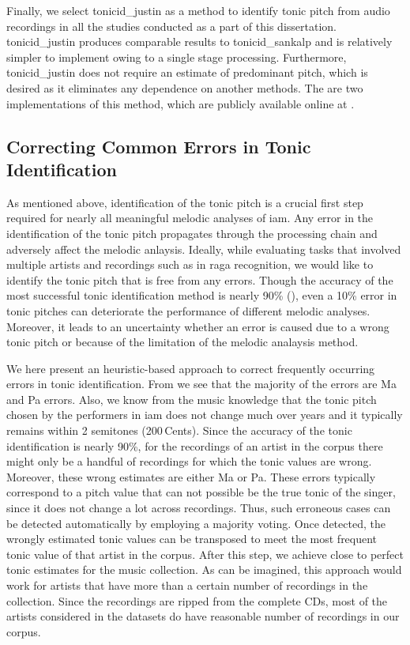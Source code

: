 {Finally, we select \acrshort{tonicid_justin} as a method to identify tonic pitch from audio recordings in all the studies conducted as a part of this dissertation. \acrshort{tonicid_justin} produces comparable results to \acrshort{tonicid_sankalp} and is relatively simpler to implement owing to a single stage processing. Furthermore, \acrshort{tonicid_justin} does not require an estimate of predominant pitch, which is desired as it eliminates any dependence on another methods. The are two implementations of this method, which are publicly available online at . 


\subsection{Correcting Common Errors in Tonic Identification}
\label{sec:pre_processing_tonic_identification_correcting_errors}

As mentioned above, identification of the tonic pitch is a crucial first step required for nearly all meaningful melodic analyses of \gls{iam}. Any error in the identification of the tonic pitch propagates through the processing chain and adversely affect the melodic anlaysis. Ideally, while evaluating tasks that involved multiple artists and recordings such as in \gls{raga} recognition, we would like to identify the tonic pitch that is free from any errors. Though the accuracy of the most successful tonic identification method is nearly 90\% (), even a 10\% error in tonic pitches can deteriorate the performance of different melodic analyses. Moreover, it leads to an uncertainty whether an error is caused due to a wrong tonic pitch or because of the limitation of the melodic analaysis method. 

We here present an heuristic-based approach to correct frequently occurring errors in tonic identification. From  we see that the majority of the errors are Ma and Pa errors. Also, we know from the music knowledge that the tonic pitch chosen by the performers in \gls{iam} does not change much over years and it typically remains within 2 semitones (200\,Cents). Since the accuracy of the tonic identification is nearly 90\%, for the recordings of an artist in the corpus there might only be a handful of recordings for which the tonic values are wrong. Moreover, these wrong estimates are either Ma or Pa. These errors typically correspond to a pitch value that can not possible be the true tonic of the singer, since it does not change a lot across recordings. Thus, such erroneous cases can be detected automatically by employing a majority voting. Once detected, the wrongly estimated tonic values can be transposed to meet the most frequent tonic value of that artist in the corpus. After this step, we achieve close to perfect tonic estimates for the music collection. As can be imagined, this approach would work for artists that have more than a certain number of recordings in the collection. Since the recordings are ripped from the complete CDs, most of the artists considered in the datasets do have reasonable number of recordings in our corpus.

}
